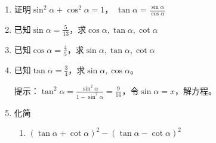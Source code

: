 \begin{ex}
\begin{enumerate}
    \item 证明$\sin^2\alpha+\cos^2\alpha=1$， $\tan\alpha=\frac{\sin\alpha}{\cos\alpha}$
    \item 已知$\sin\alpha=\frac{5}{13}$，求$\cos\alpha, \tan\alpha, \cot\alpha$
    \item 已知$\cos\alpha=\frac{4}{5}$，求$\sin\alpha, \tan\alpha, \cot\alpha$
    \item 已知$\tan\alpha=\frac{3}{4}$，求$\sin\alpha,\cos\alpha$。
    
提示：$\tan^2\alpha =\frac{\sin^2\alpha}{1-\sin^2\alpha}=\frac{9}{16}$，令$\sin \alpha =x$，解方程。

\item 化简

\begin{enumerate}
    \item $(\tan\alpha+\cot\alpha)^2-(\tan\alpha-\cot\alpha)^2$
\end{enumerate}

\end{enumerate}
\end{ex}

